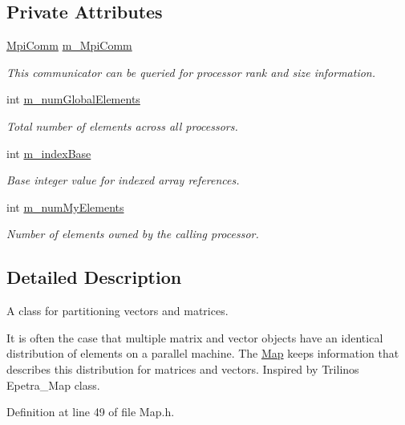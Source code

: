 \subsection*{Private Attributes}
\begin{DoxyCompactItemize}
\item 
\hyperlink{class_q_u_e_s_o_1_1_mpi_comm}{Mpi\-Comm} \hyperlink{class_q_u_e_s_o_1_1_map_aa002700b90ae2edbf5b3ee6968b28c50}{m\-\_\-\-Mpi\-Comm}
\begin{DoxyCompactList}\small\item\em This communicator can be queried for processor rank and size information. \end{DoxyCompactList}\item 
int \hyperlink{class_q_u_e_s_o_1_1_map_a67c0e876f9c6e9dcf9eba45d34c02b0a}{m\-\_\-num\-Global\-Elements}
\begin{DoxyCompactList}\small\item\em Total number of elements across all processors. \end{DoxyCompactList}\item 
int \hyperlink{class_q_u_e_s_o_1_1_map_a26b42eedd432d109ac0e349eff15da29}{m\-\_\-index\-Base}
\begin{DoxyCompactList}\small\item\em Base integer value for indexed array references. \end{DoxyCompactList}\item 
int \hyperlink{class_q_u_e_s_o_1_1_map_afdde1747848ac8dd3cebf8eed159de82}{m\-\_\-num\-My\-Elements}
\begin{DoxyCompactList}\small\item\em Number of elements owned by the calling processor. \end{DoxyCompactList}\end{DoxyCompactItemize}


\subsection{Detailed Description}
A class for partitioning vectors and matrices. 

It is often the case that multiple matrix and vector objects have an identical distribution of elements on a parallel machine. The \hyperlink{class_q_u_e_s_o_1_1_map}{Map} keeps information that describes this distribution for matrices and vectors. Inspired by Trilinos Epetra\-\_\-\-Map class. 

Definition at line 49 of file Map.\-h.



